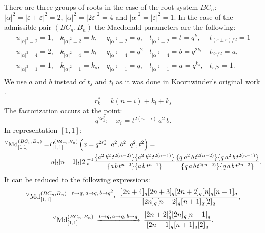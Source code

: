 \documentclass{article}
\def\nn{\nonumber}
\def\MDv{{^\vee\hbox{Md}}}
\def\nn{\nonumber}
\def\ve{\varepsilon}
\begin{document}
There are three groups of roots in the case of the root system $BC_n$: $|\alpha|^2=|\varepsilon \pm \varepsilon|^2 = 2$,  $|\alpha|^2= |2\varepsilon|^2 = 4$ and  $|\alpha|^2= |\varepsilon|^2 = 1$.  In the case of the admissible pair $(BC_n, B_n)$ the Macdonald parameters are the following:
\begin{equation}
    \begin{array}{lllll}
   u_{|\alpha|^2 = 2} = 1, &  k_{|\alpha|^2 = 2} = k,  &    q_{|\alpha|^2 = 2} = q, & t_{|\alpha|^2 = 2} =t= q^k , & t_{(\varepsilon\pm\varepsilon)/2} = 1 \\
      u_{|\alpha|^2 = 4} = 2, & k_{|\alpha|^2 = 4} = k_l &    q_{|\alpha|^2 = 4} = q^{2}&  t_{|\alpha|^2 = 4} = b =q^{2 k_l} & t_{2\varepsilon/2} = a,\\
       u_{|\alpha|^2 = 1} = 1, & k_{|\alpha|^2 = 1} = k_s, &    q_{|\alpha|^2 = 1} = q,&  t_{|\alpha|^2 = 1} =  a =q^{k_s}, & t_{\ve/2} = 1. \\
    \end{array}
\end{equation}
We use $a$ and $b$ instead of $t_s$ and $t_l$ as it was done in Koornwinder's original work \cite{Koorn}.
\begin{equation}
    r_k^* = k(n-i) +k_l+k_s
\end{equation}
The factorization occurs at the point:
\begin{equation}
    q^{2r^*_k}: \quad x_i = t^{2(n-i)}\, a^2 \, b.
\end{equation}
In representation $[1,1]$:
\begin{align}
    \MDv_{[1,1]}^{(BC_n,B_n)}= &   P_{[1,1]}^{(BC_n,B_n)} \left(x = q^{2r_k^*}\,|\, a^2, b^2\,|\,q^2,t^2 \right)= \\ & \nn [n]_t[n-1]_t [2]_t^{-1} \frac{\{a^2 \,b^2\, t^{2(n-2)}\} \{a^2\, b^2\, t^{2(n-1)}\}}{\{a \,b\, t^{n-2}\} \{a\, b\, t^{n-1}\}} \frac{
   \{q \, a^2\, b\, t^{2 (n-2)}\} \{q \,a^2\, b \, t^{2
   (n-1)}\}}{\{q \,a \,b \, t^{2 (n-2)}\} \{q \, a \, b \,
   t^{2 n-3}\}}.
\end{align}
It can be reduced to the following expressions:
 \begin{equation}
    \MDv_{[1,1]}^{(BC_n,B_n)} \,\xrightarrow[]{t\rightarrow q,\, a \rightarrow q,\, b \rightarrow q^2} \, \frac{[2n+4]_q[2n+3]_q[2n+2]_q[n]_q[n-1]_q}{[2n]_q[n+2]_q[n+1]_q[2]_q},
\end{equation}
 \begin{equation}
    \MDv_{[1,1]}^{(BC_n,B_n)} \,\xrightarrow[]{t\rightarrow q,\, a \rightarrow q,\, b \rightarrow q} \, \frac{[2n+2]^2_q[2n]_q[n-1]_q}{[2n-1]_q[n+1]_q[2]_q}.
\end{equation}
\end{document}
